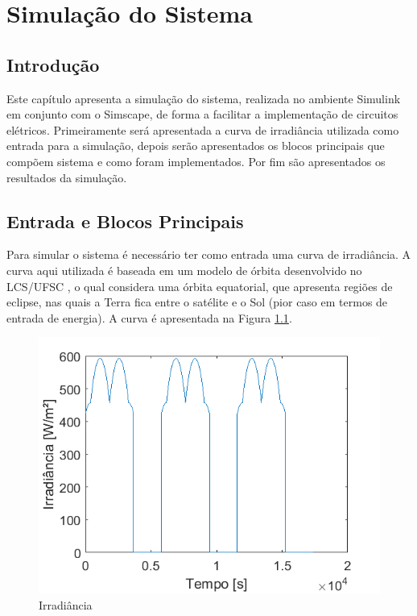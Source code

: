\chapter{Simulação do Sistema} \label{secao:simulacao_sistema}

\section{Introdução}

Este capítulo apresenta a simulação do sistema, realizada no ambiente Simulink em conjunto com o Simscape, de forma a facilitar a implementação de circuitos elétricos. Primeiramente será apresentada a curva de irradiância utilizada como entrada para a simulação, depois serão apresentados os blocos principais que compõem sistema e como foram implementados. Por fim são apresentados os resultados da simulação.

\section{Entrada e Blocos Principais}

Para simular o sistema é necessário ter como entrada uma curva de irradiância. A curva aqui utilizada é baseada em um modelo de órbita desenvolvido no LCS/UFSC \cite{slongo2016}, o qual considera uma órbita equatorial, que apresenta regiões de eclipse, nas quais a Terra fica entre o satélite e o Sol (pior caso em termos de entrada de energia). A curva é apresentada na Figura \ref{figura_irradiancia_simulacao}.

\begin{figure}[!htpb]
\begin{center}
\includegraphics[scale=0.5]{figures/simulatedIrradiance.png}
\caption{Irradiância}
\label{figura_irradiancia_simulacao}
\end{center}
\end{figure}

